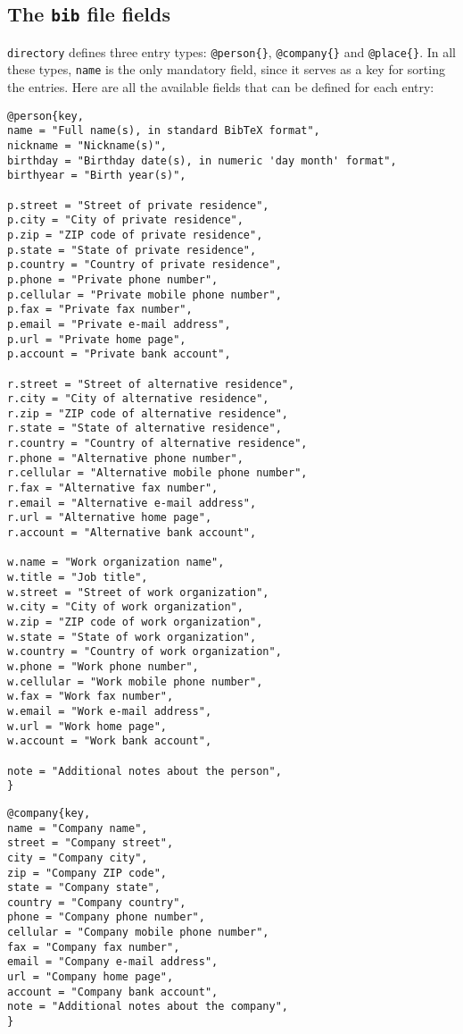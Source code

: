 \documentclass[10pt]{article}
\begin{document}
\subsection{The \texttt{bib} file fields}

\texttt{directory} defines three entry types: \verb'@person{}',
\verb'@company{}' and \verb'@place{}'. In all these types, \texttt{name} is
the only mandatory field, since it serves as a key for sorting the entries.
Here are all the available fields that can be defined for each entry:

\begin{verbatim}
@person{key,
name = "Full name(s), in standard BibTeX format",
nickname = "Nickname(s)",
birthday = "Birthday date(s), in numeric 'day month' format",
birthyear = "Birth year(s)",

p.street = "Street of private residence",
p.city = "City of private residence",
p.zip = "ZIP code of private residence",
p.state = "State of private residence",
p.country = "Country of private residence",
p.phone = "Private phone number",
p.cellular = "Private mobile phone number",
p.fax = "Private fax number",
p.email = "Private e-mail address",
p.url = "Private home page",
p.account = "Private bank account",

r.street = "Street of alternative residence",
r.city = "City of alternative residence",
r.zip = "ZIP code of alternative residence",
r.state = "State of alternative residence",
r.country = "Country of alternative residence",
r.phone = "Alternative phone number",
r.cellular = "Alternative mobile phone number",
r.fax = "Alternative fax number",
r.email = "Alternative e-mail address",
r.url = "Alternative home page",
r.account = "Alternative bank account",

w.name = "Work organization name",
w.title = "Job title",
w.street = "Street of work organization",
w.city = "City of work organization",
w.zip = "ZIP code of work organization",
w.state = "State of work organization",
w.country = "Country of work organization",
w.phone = "Work phone number",
w.cellular = "Work mobile phone number",
w.fax = "Work fax number",
w.email = "Work e-mail address",
w.url = "Work home page",
w.account = "Work bank account",

note = "Additional notes about the person",
}
\end{verbatim}

\begin{verbatim}
@company{key,
name = "Company name",
street = "Company street",
city = "Company city",
zip = "Company ZIP code",
state = "Company state",
country = "Company country",
phone = "Company phone number",
cellular = "Company mobile phone number",
fax = "Company fax number",
email = "Company e-mail address",
url = "Company home page",
account = "Company bank account",
note = "Additional notes about the company",
}
\end{verbatim}
\end{document}
